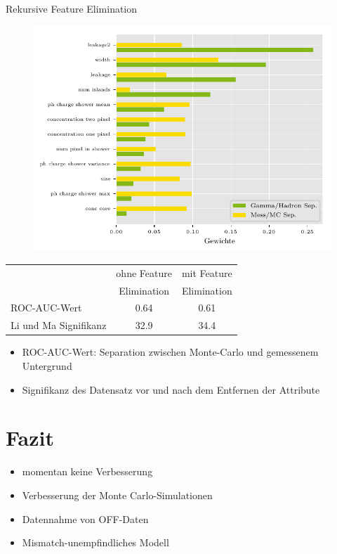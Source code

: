 \documentclass[aspectratio=1610, professionalfonts, 9pt]{beamer}
\begin{document}
\begin{frame}{Rekursive Feature Elimination}
  \begin{figure}
	\centering
	\includegraphics[height=0.9\textheight]{./Plots/feature_elemination.pdf}
  \end{figure}
\end{frame}

\begin{frame}
  \begin{table}
	\centering
	\begin{tabular}{l c c}
	  \toprule
	  & ohne Feature 	& mit Feature\\
	  & Elimination 	& Elimination\\
	  \cmidrule(r){2-3}
	  ROC-AUC-Wert            & \num{0.64} & \num{0.61} \\
	  Li und Ma Signifikanz   & \SI{32.9}{\sigma} & \SI{34.4}{\sigma} \\
	  \bottomrule
	\end{tabular}
  \end{table}
  \vspace{1cm}
  \begin{itemize}
	\item ROC-AUC-Wert: Separation zwischen Monte-Carlo und gemessenem Untergrund
	\item Signifikanz des Datensatz vor und nach dem Entfernen der Attribute
  \end{itemize}
\end{frame}

\section{Fazit}
\begin{frame}
  \begin{itemize}
	\item momentan keine Verbesserung
	\item Verbesserung der Monte Carlo-Simulationen 
	\item Datennahme von OFF-Daten
	\item Mismatch-unempfindliches Modell
  \end{itemize}
\end{frame}
\end{document}
